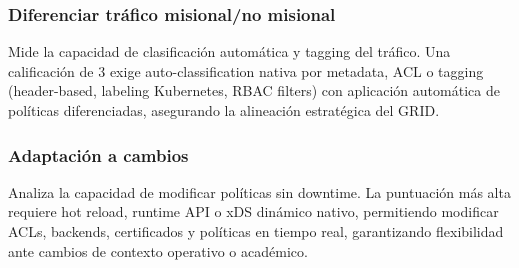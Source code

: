 \subsubsection{Diferenciar tráfico misional/no misional}

Mide la capacidad de clasificación automática y tagging del tráfico. Una calificación de 3 exige auto-classification nativa por metadata, ACL o tagging (header-based, labeling Kubernetes, RBAC filters) con aplicación automática de políticas diferenciadas, asegurando la alineación estratégica del GRID.

\subsubsection{Adaptación a cambios}

Analiza la capacidad de modificar políticas sin downtime. La puntuación más alta requiere hot reload, runtime API o xDS dinámico nativo, permitiendo modificar ACLs, backends, certificados y políticas en tiempo real, garantizando flexibilidad ante cambios de contexto operativo o académico.
